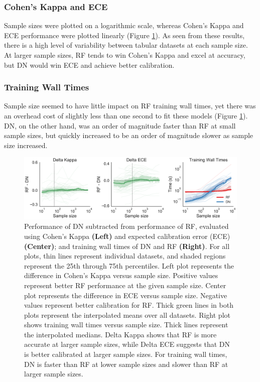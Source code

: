 \subsubsection{Cohen's Kappa and ECE}
Sample sizes were plotted on a logarithmic scale, whereas Cohen's Kappa and ECE performance were plotted linearly (Figure \ref{fig:tab}). As seen from these results, there is a high level of variability between tabular datasets at each sample size. At larger sample sizes, RF tends to win Cohen's Kappa and excel at accuracy, but DN would win ECE and achieve better calibration.

\subsubsection{Training Wall Times}
Sample size seemed to have little impact on RF training wall times, yet there was an overhead cost of slightly less than one second to fit these models (Figure \ref{fig:tab}). DN, on the other hand, was an order of magnitude faster than RF at small sample sizes, but quickly increased to be an order of magnitude slower as sample size increased.

\begin{figure}[!htb]
\centering
\includegraphics[width=1.0\textwidth]{figures/cc18.pdf}
  \caption{Performance of DN subtracted from performance of RF, evaluated using Cohen's Kappa \textbf{(Left)} and expected calibration error (ECE) \textbf{(Center)}; and training wall times of DN and RF \textbf{(Right)}. 
  For all plots, thin lines represent individual datasets, and shaded regions represent the 25th through 75th percentiles. Left plot represents the difference in Cohen's Kappa versus sample size. Positive values represent better RF performance at the given sample size. Center plot represents the difference in ECE versus sample size. Negative values represent better calibration for RF. Thick green lines in both plots represent the interpolated means over all datasets. Right plot shows training wall times versus sample size. Thick lines represent the interpolated medians. 
  Delta Kappa shows that RF is more accurate at larger sample sizes, while Delta ECE suggests that DN is better calibrated at larger sample sizes. For training wall times, DN is faster than RF at lower sample sizes and slower than RF at larger sample sizes.
  }
\label{fig:tab}
\end{figure}

